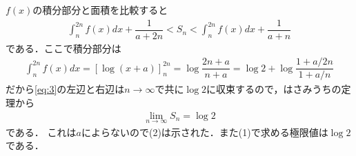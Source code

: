 \documentclass[../../main.tex]{subfiles}
\begin{document}
$f(x)$の積分部分と面積を比較すると
\begin{align}
  \int_n^{2n}f(x)dx+\dfrac{1}{a+2n}<S_n<\int_n^{2n}f(x)dx+\dfrac{1}{a+n}  \label{eq:3}
\end{align}
である．ここで積分部分は
\begin{align}
  \int_n^{2n}f(x)dx=\left[\log(x+a)\right]_n^{2n}=\log\dfrac{2n+a}{n+a}=\log2+\log\dfrac{1+a/2n}{1+a/n}
\end{align}
だから\cref{eq:3}の左辺と右辺は$n\to\infty$で共に$\log2$に収束するので，はさみうちの定理から
\begin{align}
  \lim_{n\to\infty}S_n = \log2
\end{align}
である．
これは$a$によらないので(2)は示された．また(1)で求める極限値は$\log 2$である．

\newpage
\end{document}

